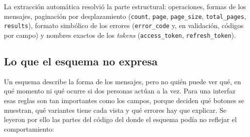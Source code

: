 La extracción automática resolvió la parte estructural: operaciones, formas de los mensajes,
paginación por desplazamiento (\texttt{count}, \texttt{page}, \texttt{page\_size},
\texttt{total\_pages}, \texttt{results}), formato simbólico de los errores
(\texttt{error\_code} y, en validación, códigos por campo) y nombres exactos de los
\textit{tokens} (\texttt{access\_token}, \texttt{refresh\_token}).

\subsection{Lo que el esquema no expresa}

Un esquema describe la forma de los mensajes, pero no quién puede ver qué, en qué momento ni
qué ocurre si dos personas actúan a la vez. Para una interfaz esas reglas son tan
importantes como los campos, porque deciden qué botones se muestran, qué variantes tiene
cada vista y qué errores hay que explicar. Se leyeron por ello las partes del código del
 donde el esquema podía no reflejar el comportamiento:
